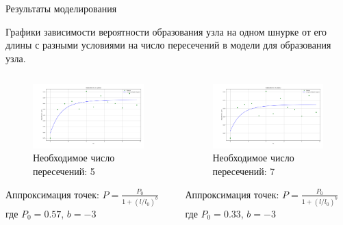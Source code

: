 \begin{frame}{Результаты моделирования}
		\begin{block}{}
			Графики зависимости вероятности образования узла на одном шнурке от его длины с разными условиями на число пересечений в модели для образования узла.
		\end{block}



	\begin{columns}

		\begin{column}{0.5\linewidth}
			\begin{figure}[H]
				\includegraphics[width=1\linewidth]{img/model_55.png}
				Необходимое число пересечений: 5
			\end{figure}
			Аппроксимация точек:
			$P = \frac{P_0}{1+(l/l_0)^b}$
			где $P_0 = 0.57$, $b = -3$
		\end{column}

		\begin{column}{0.5\linewidth}
			\begin{figure}[H]
				\includegraphics[width=1\linewidth]{img/model_7.png}
				Необходимое число пересечений: 7
			\end{figure}
			Аппроксимация точек:
			$P = \frac{P_0}{1+(l/l_0)^b}$
			где $P_0 = 0.33$, $b = -3$
		\end{column}
	\end{columns}

\end{frame}

